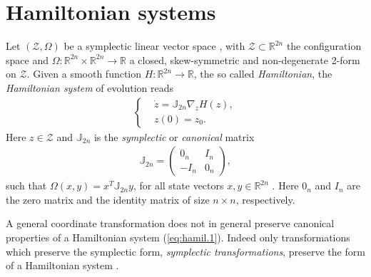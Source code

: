 \section{Hamiltonian systems}
\label{sec:hamil}

Let $(\mathcal Z, \Omega)$ be a symplectic linear vector space \cite{Marsden:2010:IMS:1965128}, with $\mathcal Z \subset \mathbb R^{2n}$ the configuration space and $\Omega:\mathbb R^{2n}\times\mathbb R^{2n} \to \mathbb R$ a closed, skew-symmetric and non-degenerate 2-form on $\mathcal Z$.  Given a smooth function $H:\mathbb R^{2n} \to \mathbb R$, the so called \emph{Hamiltonian}, the \emph{Hamiltonian system} of evolution reads
\begin{eqnarray}\label{eq:hamil.1}
\left\{
\begin{aligned}
	& \dot z = \mathbb J_{2n} \nabla_z H(z),  \\
	&  z(0) = z_0.
\end{aligned}
\right.
\end{eqnarray}
Here $z\in \mathcal Z$  and $\mathbb J_{2n}$ is the \emph{symplectic} or \emph{canonical} matrix
\begin{eqnarray} \label{eq:hamil.2}
	\mathbb{J}_{2n} = 
	\begin{pmatrix}
	0_n & I_n \\
	-I_n & 0_n
	\end{pmatrix},
\end{eqnarray}
such that $\Omega(x,y) = x^T\mathbb J_{2n}y$, for all state vectors $x,y\in \mathbb R^{2n}$ \cite{Marsden:2010:IMS:1965128}. Here $0_n$ and $I_n$ are the zero matrix and the identity matrix of size $n\times n$, respectively.

A general coordinate transformation does not in general preserve canonical properties of a Hamiltonian system (\ref{eq:hamil.1}). Indeed only transformations which preserve the symplectic form, \emph{symplectic transformations}, preserve the form of a Hamiltonian system \cite{Hairer:1250576}.

